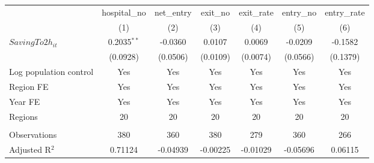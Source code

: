 \begingroup
\centering
\begin{tabular}{lcccccc}
   \toprule
                          & hospital\_no  & net\_entry  & exit\_no  & exit\_rate  & entry\_no  & entry\_rate \\    
                          & (1)           & (2)         & (3)       & (4)         & (5)        & (6)\\  
   \midrule 
   $SavingTo2h_{it}$      & 0.2035$^{**}$ & -0.0360     & 0.0107    & 0.0069      & -0.0209    & -0.1582\\   
                          & (0.0928)      & (0.0506)    & (0.0109)  & (0.0074)    & (0.0566)   & (0.1379)\\   
   Log population control & Yes           & Yes         & Yes       & Yes         & Yes        & Yes\\  
   Region FE              & Yes           & Yes         & Yes       & Yes         & Yes        & Yes\\  
   Year FE                & Yes           & Yes         & Yes       & Yes         & Yes        & Yes\\  
   Regions                & 20            & 20          & 20        & 20          & 20         & 20\\  
    \\
   Observations           & 380           & 360         & 380       & 279         & 360        & 266\\  
   Adjusted R$^2$         & 0.71124       & -0.04939    & -0.00225  & -0.01029    & -0.05696   & 0.06115\\  
   \bottomrule
\end{tabular}
\par\endgroup
